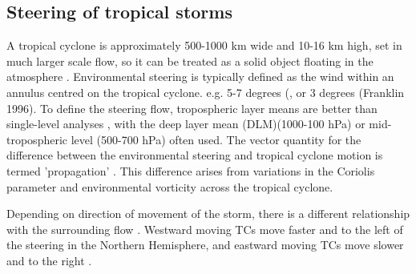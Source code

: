 


\subsection{Steering of tropical storms} \label{steer}




A tropical cyclone is approximately 500-1000 km wide and 10-16 km high, set in much larger scale flow, so it can be treated as a solid object floating in the atmosphere \citep{chan2005physics}. Environmental steering is typically defined as the wind within an annulus centred on the tropical cyclone. e.g. 5-7 degrees (\citep{chan1982tropical}, \citep{chan1985identification} or 3 degrees (Franklin 1996). To define the steering flow, tropospheric layer means are better than single-level analyses \citep{velden1991basic}, with the deep layer mean (DLM)(1000-100 hPa) or mid-tropospheric level (500-700 hPa) often used. The vector quantity for the difference between the environmental steering and tropical cyclone motion is termed 'propagation' \citep{carr1990observational}. This difference arises from variations in the Coriolis parameter and environmental vorticity across the tropical cyclone. 

Depending on direction of movement of the storm, there is a different relationship with the surrounding flow \citep{chan1985identification}. Westward moving TCs move faster and to the left of the steering in the Northern Hemisphere, and eastward moving TCs move slower and to the right \citep{carr1990observational}.

